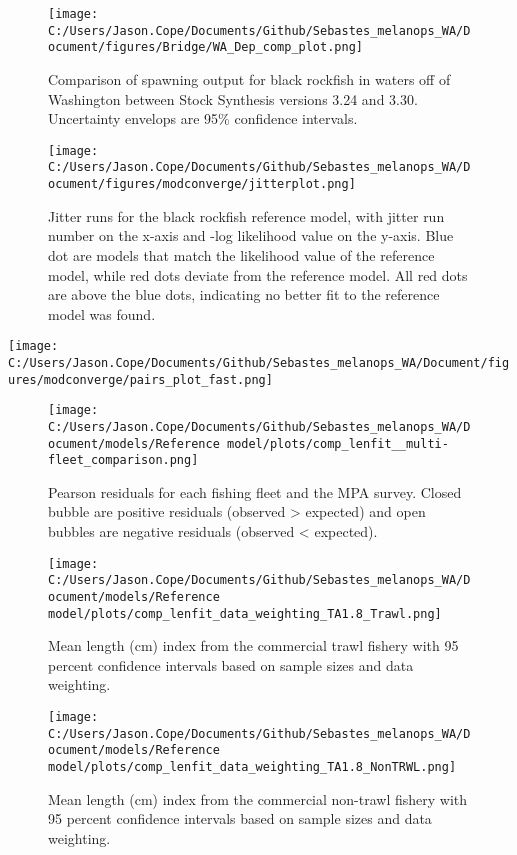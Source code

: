 \documentclass[11pt,
  english,
  letterpaper,
]{article}
\begin{document}
\begin{figure}
\centering
\texttt{[image: C:/Users/Jason.Cope/Documents/Github/Sebastes\_melanops\_WA/Document/figures/Bridge/WA\_Dep\_comp\_plot.png]}
\caption{Comparison of spawning output for black rockfish in waters off of Washington between Stock Synthesis versions 3.24 and 3.30. Uncertainty envelops are 95\% confidence intervals.\label{fig:deps_bridge_comps}}
\end{figure}

\begin{figure}
\centering
\texttt{[image: C:/Users/Jason.Cope/Documents/Github/Sebastes\_melanops\_WA/Document/figures/modconverge/jitterplot.png]}
\caption{Jitter runs for the black rockfish reference model, with jitter run number on the x-axis and -log likelihood value on the y-axis. Blue dot are models that match the likelihood value of the reference model, while red dots deviate from the reference model. All red dots are above the blue dots, indicating no better fit to the reference model was found.\label{fig:jitter}}
\end{figure}

\texttt{[image: C:/Users/Jason.Cope/Documents/Github/Sebastes\_melanops\_WA/Document/figures/modconverge/pairs\_plot\_fast.png]} \clearpage

\begin{figure}
\centering
\texttt{[image: C:/Users/Jason.Cope/Documents/Github/Sebastes\_melanops\_WA/Document/models/Reference model/plots/comp\_lenfit\_\_multi-fleet\_comparison.png]}
\caption{Pearson residuals for each fishing fleet and the MPA survey. Closed bubble are positive residuals (observed \textgreater{} expected) and open bubbles are negative residuals (observed \textless{} expected).\label{fig:lt-pearson-resids}}
\end{figure}

\begin{figure}
\centering
\texttt{[image: C:/Users/Jason.Cope/Documents/Github/Sebastes\_melanops\_WA/Document/models/Reference model/plots/comp\_lenfit\_data\_weighting\_TA1.8\_Trawl.png]}
\caption{Mean length (cm) index from the commercial trawl fishery with 95 percent confidence intervals based on sample sizes and data weighting.\label{fig:trawl-mean-len-fit}}
\end{figure}

\begin{figure}
\centering
\texttt{[image: C:/Users/Jason.Cope/Documents/Github/Sebastes\_melanops\_WA/Document/models/Reference model/plots/comp\_lenfit\_data\_weighting\_TA1.8\_NonTRWL.png]}
\caption{Mean length (cm) index from the commercial non-trawl fishery with 95 percent confidence intervals based on sample sizes and data weighting.\label{fig:nontrawl-mean-len-fit}}
\end{figure}
\end{document}
